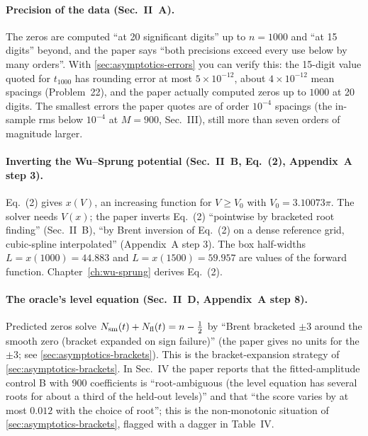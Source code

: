 \paragraph{Precision of the data (Sec.~II~A).} The zeros are computed ``at 20 significant digits'' up to $n=1000$ and ``at 15 digits'' beyond, and the paper says ``both precisions exceed every use below by many orders''. With \cref{sec:asymptotics-errors} you can verify this: the 15-digit value quoted for $t_{1000}$ has rounding error at most $5\times10^{-12}$, about $4\times10^{-12}$ mean spacings (Problem~22), and the paper actually computed zeros up to $1000$ at 20 digits. The smallest errors the paper quotes are of order $10^{-4}$ spacings (the in-sample rms below $10^{-4}$ at $M=900$, Sec.~III), still more than seven orders of magnitude larger.

\paragraph{Inverting the Wu--Sprung potential (Sec.~II~B, Eq.~(2), Appendix~A step 3).} Eq.~(2) gives $x(V)$, an increasing function for $V\ge V_0$ with $V_0=3.10073\pi$. The solver needs $V(x)$; the paper inverts Eq.~(2) ``pointwise by bracketed root finding'' (Sec.~II~B), ``by Brent inversion of Eq.~(2) on a dense reference grid, cubic-spline interpolated'' (Appendix~A step 3). The box half-widths $L=x(1000)=44.883$ and $L=x(1500)=59.957$ are values of the forward function. Chapter~\ref{ch:wu-sprung} derives Eq.~(2).

\paragraph{The oracle's level equation (Sec.~II~D, Appendix~A step 8).} Predicted zeros solve $N_{\mathrm{sm}}(t)+N_{\mathrm{fl}}(t)=n-\tfrac12$ by ``Brent bracketed $\pm3$ around the smooth zero (bracket expanded on sign failure)'' (the paper gives no units for the $\pm3$; see \cref{sec:asymptotics-brackets}). This is the bracket-expansion strategy of \cref{sec:asymptotics-brackets}. In Sec.~IV the paper reports that the fitted-amplitude control B with 900 coefficients is ``root-ambiguous (the level equation has several roots for about a third of the held-out levels)'' and that ``the score varies by at most $0.012$ with the choice of root''; this is the non-monotonic situation of \cref{sec:asymptotics-brackets}, flagged with a dagger in Table~IV.

